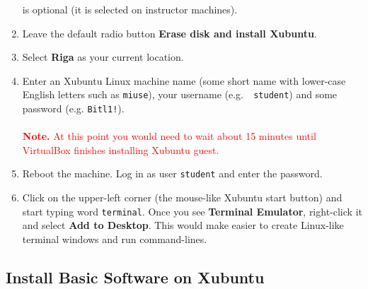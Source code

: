 \documentclass[11pt,a4paper]{article}
\begin{document}
\begin{enumerate}
is optional (it is selected on instructor machines).
\item Leave the default radio button {\bf Erase disk and install Xubuntu}.
\item Select {\bf Riga} as your current location.
\item Enter an Xubuntu Linux machine name (some short name with lower-case English letters such as 
{\tt miuse}), your username (e.g.\ {\tt 
student}) and some password (e.g. {\tt Bitl1!}).\\
\\
\textcolor{red}{{\bf Note.} At this point you would need to wait about 15 minutes until VirtualBox finishes installing Xubuntu guest.} 
\item Reboot the machine. Log in as user {\tt student} and enter the password.
\item Click on the upper-left corner (the mouse-like Xubuntu start button) and start 
typing word {\tt terminal}. Once you see {\bf Terminal Emulator}, right-click it and 
select {\bf Add to Desktop}. This would make easier to create Linux-like terminal windows
and run command-lines.\\
\end{enumerate}


\subsection{Install Basic Software on Xubuntu}
\end{document}
